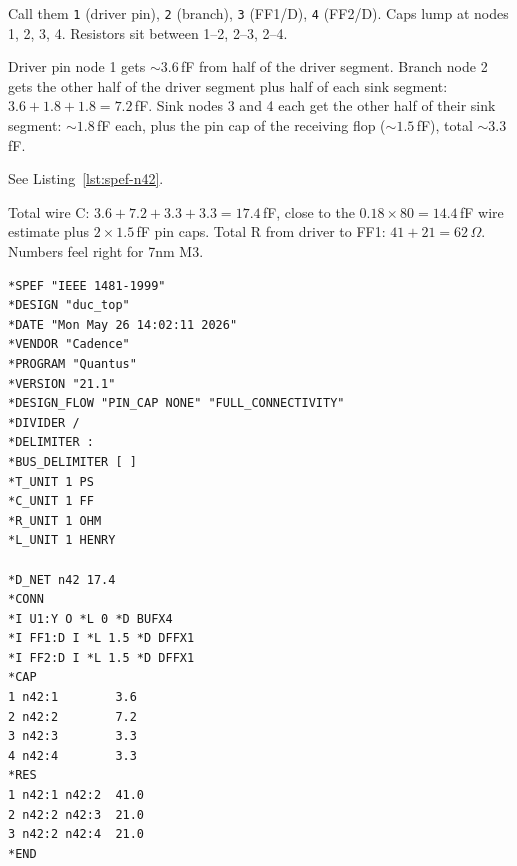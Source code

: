 Call them \texttt{1} (driver pin), \texttt{2} (branch), \texttt{3} (FF1/D), \texttt{4} (FF2/D). Caps lump at nodes 1, 2, 3, 4. Resistors sit between 1--2, 2--3, 2--4.

 Driver pin node 1 gets $\sim 3.6$\,fF from half of the driver segment. Branch node 2 gets the other half of the driver segment plus half of each sink segment: $3.6 + 1.8 + 1.8 = 7.2$\,fF. Sink nodes 3 and 4 each get the other half of their sink segment: $\sim 1.8$\,fF each, plus the pin cap of the receiving flop ($\sim 1.5$\,fF), total $\sim 3.3$\,fF.

 See Listing~\ref{lst:spef-n42}.

 Total wire C: $3.6 + 7.2 + 3.3 + 3.3 = 17.4$\,fF, close to the $0.18 \times 80 = 14.4$\,fF wire estimate plus $2 \times 1.5$\,fF pin caps. Total R from driver to FF1: $41 + 21 = 62\,\Omega$. Numbers feel right for 7nm M3.

\begin{lstlisting}[style=eda,caption={SPEF snippet for net \texttt{n42}. Reduced and slightly idealized.},label={lst:spef-n42}]
*SPEF "IEEE 1481-1999"
*DESIGN "duc_top"
*DATE "Mon May 26 14:02:11 2026"
*VENDOR "Cadence"
*PROGRAM "Quantus"
*VERSION "21.1"
*DESIGN_FLOW "PIN_CAP NONE" "FULL_CONNECTIVITY"
*DIVIDER /
*DELIMITER :
*BUS_DELIMITER [ ]
*T_UNIT 1 PS
*C_UNIT 1 FF
*R_UNIT 1 OHM
*L_UNIT 1 HENRY

*D_NET n42 17.4
*CONN
*I U1:Y O *L 0 *D BUFX4
*I FF1:D I *L 1.5 *D DFFX1
*I FF2:D I *L 1.5 *D DFFX1
*CAP
1 n42:1        3.6
2 n42:2        7.2
3 n42:3        3.3
4 n42:4        3.3
*RES
1 n42:1 n42:2  41.0
2 n42:2 n42:3  21.0
3 n42:2 n42:4  21.0
*END
\end{lstlisting}

